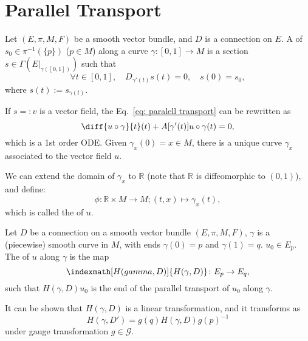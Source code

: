 \documentclass[openany, oneside, a5paper]{book}
\begin{document}
\section{Parallel Transport}

\begin{definition}
    Let $(E, \pi, M, F)$ be a smooth vector bundle, and $D$ is a connection on $E$.
    A  of $s_0 \in \pi^{-1}(\{p\})$ ($p \in M$) along a curve $\gamma \colon [0, 1] \to M$ is a section $s \in \Gamma(E|_{\gamma([0, 1])})$ such that
    \begin{equation}\label{eq: paralell transport}
        \forall t \in [0, 1], 
        \quad 
        D_{\gamma'(t)} s(t) = 0,
        \quad
        s(0) = s_0,
    \end{equation}
    where $s(t) := s_{\gamma(t)}$.
\end{definition}

If $s =:v$ is a vector field, the Eq.~\eqref{eq: paralell transport} can be rewritten as
\begin{equation}
    \diff {u \circ \gamma} {t} (t) + A[\gamma'(t)] u \circ \gamma(t) = 0,
\end{equation}
which is a 1st order ODE.
Given $\gamma_x(0) = x \in M$, there is a unique curve $\gamma_x$ associated to the vector field $u$.

We can extend the domain of $\gamma_x$ to $\mathbb R$ (note that $\mathbb R$ is diffeomorphic to $(0, 1)$), and define:
\begin{equation}
    \phi \colon \mathbb R \times M \to M; (t, x) \mapsto \gamma_x(t),
\end{equation}
which is called the  of $u$.  %

\begin{definition}[Holonomy]
    Let $D$ be a connection on a smooth vector bundle $(E, \pi, M, F)$, $\gamma$ is a (piecewise) smooth curve in $M$, with ends $\gamma(0) = p$ and $\gamma(1) = q$.
    $u_0 \in E_p$.
    The  of $u$ along $\gamma$ is the map
    \begin{equation}
        \indexmath[H(gamma, D)]{H(\gamma, D)} \colon E_p \to E_q,
    \end{equation}
    such that $H(\gamma, D) u_0$ is the end of the parallel transport of $u_0$ along $\gamma$.
\end{definition}

It can be shown that $H(\gamma, D)$ is a linear transformation, and it transforms as
\begin{equation}
    H(\gamma, D') = g(q) H(\gamma, D) g(p)^{-1}
\end{equation}
under gauge transformation $g \in \mathcal G$.
\end{document}
